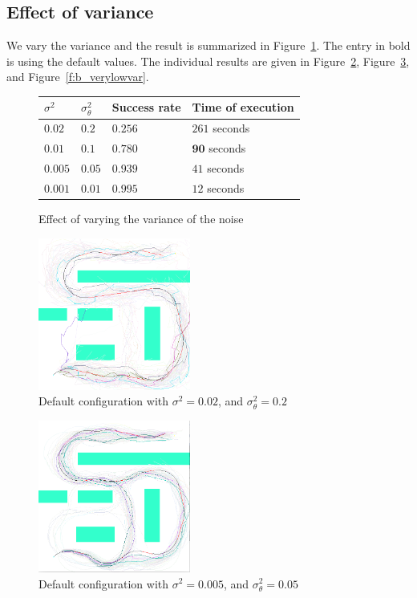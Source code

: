 \documentclass[a4paper]{article}
\begin{document}
\subsection{Effect of variance}

We vary the variance and the result is summarized in
Figure~\ref{f:variance}. The entry in bold is using the default values.
The individual results are given in Figure~\ref{f:b_veryhivar}, Figure~\ref{f:b_lowvar},
and Figure~\ref{f:b_verylowvar}.

\begin{figure}
\caption{Effect of varying the variance of the noise}
\label{f:variance}
\begin{tabular}{ l | l | l | l }
  $\sigma^2$ & $\sigma_\theta^2$ & Success rate & Time of execution \\ \hline \hline
  $0.02$ & $0.2$ & $0.256$ & $261$ seconds \\ \hline  %
  $\mathbf{0.01}$ & $\mathbf{0.1}$ & $\mathbf{0.780}$ & $\mathbf{90}$ seconds \\ \hline
  $0.005$ & $0.05$ & $0.939$ & $41$ seconds \\ \hline  %
  $0.001$ & $0.01$ & $0.995$ & $12$ seconds \\ \hline  %
\end{tabular}
\end{figure}

\begin{figure}
\caption{Default configuration with $\sigma^2=0.02$, and $\sigma_\theta^2=0.2$}
\label{f:b_veryhivar}
\centerline{\includegraphics[width=5cm]{b_veryhivar.png}}
\end{figure}

\begin{figure}
\caption{Default configuration with $\sigma^2=0.005$, and $\sigma_\theta^2=0.05$}
\label{f:b_lowvar}
\centerline{\includegraphics[width=5cm]{b_lowvar.png}}
\end{figure}
\end{document}
